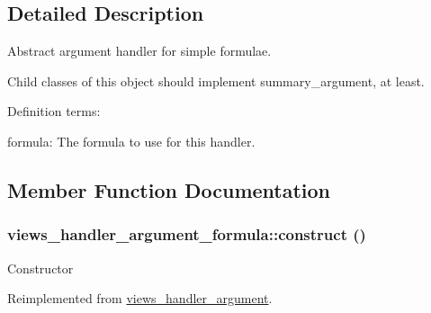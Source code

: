 \subsection{Detailed Description}
Abstract argument handler for simple formulae.

Child classes of this object should implement summary\_\-argument, at least.

Definition terms:
\begin{DoxyItemize}
\item formula: The formula to use for this handler. 
\end{DoxyItemize}

\subsection{Member Function Documentation}
\hypertarget{classviews__handler__argument__formula_a01284402427de2bcfa1b1da5792a2332}{
\subsubsection[{construct}]{\setlength{\rightskip}{0pt plus 5cm}views\_\-handler\_\-argument\_\-formula::construct ()}}
\label{classviews__handler__argument__formula_a01284402427de2bcfa1b1da5792a2332}
Constructor 

Reimplemented from \hyperlink{classviews__handler__argument_a93594a31e95e1a14cead4f038d7b321b}{views\_\-handler\_\-argument}.

